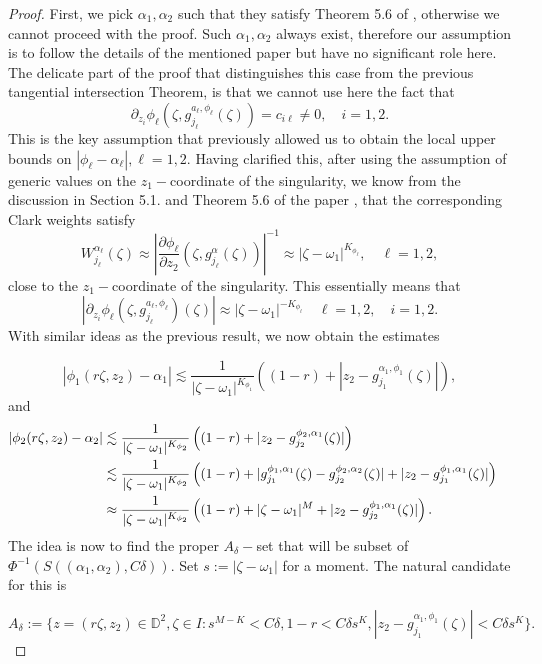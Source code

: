\documentclass[12pt]{amsart}
\numberwithin{equation}{section}
\begin{document}
\begin{proof} First, we pick $\alpha_1,\alpha_2$ such that they satisfy Theorem 5.6 of \cite{Clark}, otherwise we cannot proceed with the proof. Such $\alpha_1,\alpha_2$ always exist, therefore our assumption is to follow the details of the mentioned paper but have no significant role here. The delicate part of the proof that distinguishes this case from the previous tangential intersection Theorem, is that we cannot use here the fact that
$$\partial_{z_i}\phi_{\ell}(\zeta,g^{a_{\ell},\phi_\ell}_{j_\ell}(\zeta))=c_{i\ell}\neq 0, \quad i=1,2.$$
This is the key assumption that previously allowed us to obtain the local upper bounds on $|\phi_{\ell}-\alpha_{\ell}|,\ell=1,2.$ Having clarified this, after using the assumption of generic values on the $z_1-$coordinate of the singularity, we know from the discussion in Section 5.1. and Theorem 5.6 of the paper \cite{Clark}, that the corresponding Clark weights satisfy $$W_{j_{\ell}}^{\alpha_\ell}(\zeta)\approx\left|\frac{\partial\phi_{\ell}}{\partial z_2}(\zeta,g_{j_\ell}^{\alpha}(\zeta))\right|^{-1}\approx |\zeta-\omega_1|^{K_{\phi_\ell}},\quad \ell=1,2,$$ close to the $z_1-$coordinate of the singularity.  This essentially means that
$$|\partial_{z_i}\phi_{\ell}(\zeta,g^{a_{\ell},\phi_\ell}_{j_\ell})(\zeta)|\approx |\zeta-\omega_1|^{-K_{\phi_\ell}}\quad \ell=1,2,\quad i=1,2.$$ With similar ideas as the previous result, we now obtain the estimates

$$|\phi_1(r\zeta,z_2)-\alpha_1|\lesssim \frac{1}{|\zeta-\omega_1|^{K_{\phi_1}}}\left((1-r)+|z_2-g^{\alpha_1,\phi_1}_{j_1}(\zeta)|\right),$$
and
\begin{align}
|\phi_2(r\zeta,z_2)-\alpha_2|&\lesssim \frac{1}{|\zeta-\omega_1|^{K_{\phi_2}}}\left((1-r)+|z_2-g^{\phi_2,\alpha_1}_{j_2}(\zeta)|\right) \notag&&\\
&\lesssim\frac{1}{|\zeta-\omega_1|^{K_{\phi_2}}}\left((1-r)+|g_{j_1}^{\phi_1,\alpha_1}(\zeta)-g_{j_2}^{\phi_2,\alpha_2}(\zeta)|+|z_2-g_{j_1}^{\phi_1,\alpha_1}(\zeta)|\right)\notag&&\\
&\approx \frac{1}{|\zeta-\omega_1|^{K_{\phi_2}}}\left((1-r)+|\zeta-\omega_1|^M+|z_2-g^{\phi_1,\alpha_1}_{j_2}(\zeta)|\right)
.\end{align}
The idea is now to find the proper $A_{\delta}-$set that will be subset of $\Phi^{-1}(S((\alpha_1,\alpha_2),C\delta)).$ Set $s:=|\zeta-\omega_1|$ for a moment.
The natural candidate for this is

$$A_{\delta}:=\Bigg\{z=(r\zeta,z_2)\in\mathbb{D}^2,\zeta\in I: s^{M-K}<C\delta,1-r<C\delta s^{K},|z_2-g_{j_1}^{\alpha_1,\phi_1}(\zeta)|<C\delta s^K \Bigg\}.$$


\end{proof}
\end{document}
